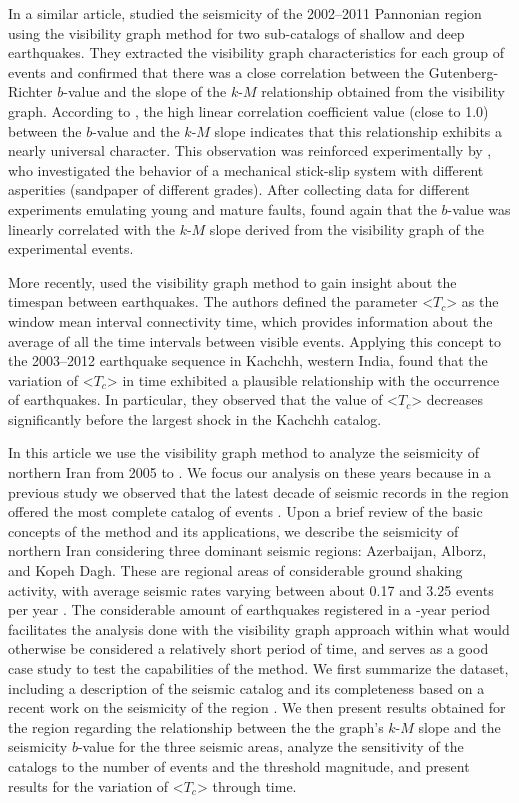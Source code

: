 In a similar article, \citet{Telesca2014} studied the seismicity of the 2002--2011 Pannonian region using the visibility graph method for two sub-catalogs of shallow and deep earthquakes. They extracted the visibility graph characteristics for each group of events and confirmed that there was a close correlation between the Gutenberg-Richter $b$-value and the slope of the $k$-$M$ relationship obtained from the visibility graph. According to \citet{Telesca2014}, the high linear correlation coefficient value (close to 1.0) between the $b$-value and the $k$-$M$ slope indicates that this relationship exhibits a nearly universal character. This observation was reinforced experimentally by \citet{Telesca2014-pone}, who investigated the behavior of a mechanical stick-slip system with different asperities (sandpaper of different grades). After collecting data for different experiments emulating young and mature faults, \citet{Telesca2014-pone} found again that the $b$-value was linearly correlated with the $k$-$M$ slope derived from the visibility graph of the experimental events.

More recently, \citet{Telesca2016} used the visibility graph method to gain insight about the timespan between earthquakes. The authors defined the parameter <$T_c$> as the window mean interval connectivity time, which provides information about the average of all the time intervals between visible events. Applying this concept to the 2003--2012 earthquake sequence in Kachchh, western India, \citet{Telesca2016} found that the variation of <$T_c$> in time exhibited a plausible relationship with the occurrence of earthquakes. In particular, they observed that the value of <$T_c$> decreases significantly before the largest shock in the Kachchh catalog.

In this article we use the visibility graph method to analyze the seismicity of northern Iran from 2005 to . We focus our analysis on these years because in a previous study we observed that the latest decade of seismic records in the region offered the most complete catalog of events . Upon a brief review of the basic concepts of the method and its applications, we describe the seismicity of northern Iran considering three dominant seismic regions: Azerbaijan, Alborz, and Kopeh Dagh. These are regional areas of considerable ground shaking activity, with average seismic rates varying between about 0.17 and 3.25 events per year \citep[e.g.,][]{Nemati2015}. The considerable amount of earthquakes registered in a -year period facilitates the analysis done with the visibility graph approach within what would otherwise be considered a relatively short period of time, and serves as a good case study to test the capabilities of the method. We first summarize the dataset, including a description of the seismic catalog and its completeness based on a recent work on the seismicity of the region . We then present results obtained for the region regarding the relationship between the the graph's $k$-$M$ slope and the seismicity $b$-value for the three seismic areas, analyze the sensitivity of the catalogs to the number of events and the threshold magnitude, and present results for the variation of <$T_c$> through time.
